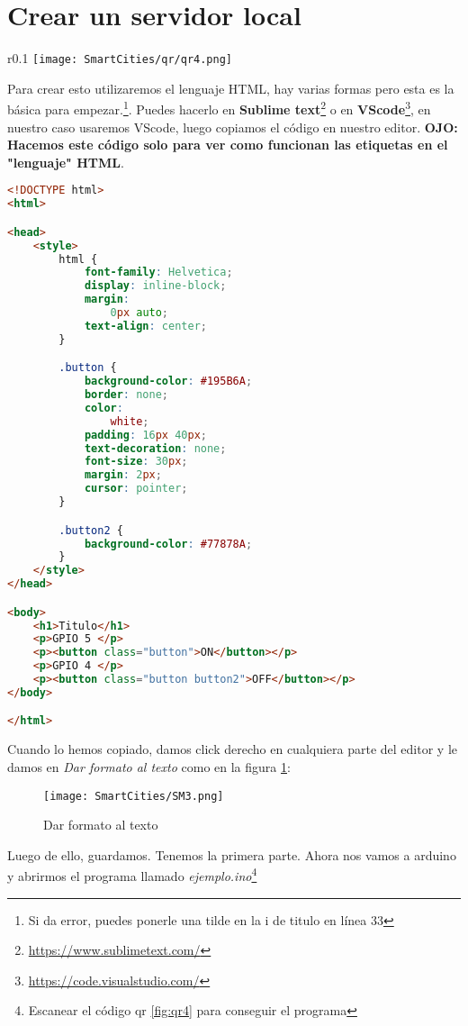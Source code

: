 \documentclass[
	11pt, %
	fleqn, %
	a4paper, %
]{LegrandOrangeBook}
\begin{document}
\section{Crear un servidor local}
\begin{wrapfigure}{r}{0.1\linewidth}
\centering\texttt{[image: SmartCities/qr/qr4.png]}
\caption{QR program: 4.Server local On Off led}
\label{fig:qr4}
\end{wrapfigure}
Para crear esto utilizaremos el lenguaje HTML, hay varias formas pero esta es la básica para empezar.\footnote{Si da error, puedes ponerle una tilde en la i de titulo en línea 33}. Puedes hacerlo en \textbf{Sublime text}\footnote{\url{https://www.sublimetext.com/}} o en \textbf{VScode}\footnote{\url{https://code.visualstudio.com/}}, en nuestro caso usaremos VScode, luego copiamos el código en nuestro editor. \textbf{OJO: Hacemos este código solo para ver como funcionan las etiquetas en el "lenguaje" HTML}.
\begin{lstlisting}[language=html, caption={Conectarse a una red WiFi},captionpos=b]
<!DOCTYPE html>
<html>

<head>
    <style>
        html {
            font-family: Helvetica;
            display: inline-block;
            margin:
                0px auto;
            text-align: center;
        }

        .button {
            background-color: #195B6A;
            border: none;
            color:
                white;
            padding: 16px 40px;
            text-decoration: none;
            font-size: 30px;
            margin: 2px;
            cursor: pointer;
        }

        .button2 {
            background-color: #77878A;
        }
    </style>
</head>

<body>
    <h1>Titulo</h1>
    <p>GPIO 5 </p>
    <p><button class="button">ON</button></p>
    <p>GPIO 4 </p>
    <p><button class="button button2">OFF</button></p>
</body>

</html>
\end{lstlisting}
Cuando lo hemos copiado, damos click derecho en cualquiera parte del editor y le damos en \textit{Dar formato al texto} como en la figura \ref{fig:VSformato}:
\begin{figure}[h]
\centering\texttt{[image: SmartCities/SM3.png]}
\caption{Dar formato al texto}
\label{fig:VSformato}
\end{figure}
Luego de ello, guardamos. Tenemos la primera parte.
Ahora nos vamos a arduino y abrirmos el programa llamado \textit{ejemplo.ino}\footnote{Escanear el código qr \ref{fig:qr4} para conseguir el programa}
\end{document}
